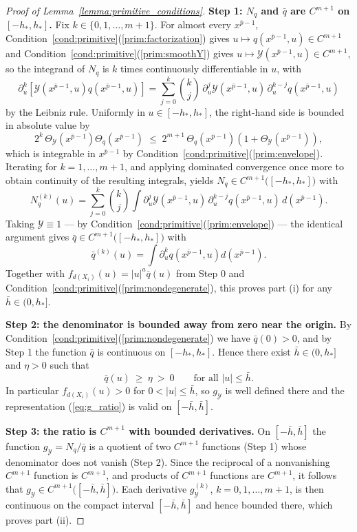 \documentclass{article}
\begin{document}
\begin{appendices}
\begin{proof}[Proof of Lemma~\ref{lemma:primitive_conditions}]
\textbf{Step 1: $N_q$ and $\bar q$ are $C^{m+1}$ on $[-h_{*},h_{*}]$.}
Fix $k\in\{0,1,\dots,m+1\}$. For almost every $x^{\bar p-1}$,
Condition~\ref{cond:primitive}(\ref{prim:factorization}) gives
$u\mapsto q\!\left(x^{\bar p-1},u\right)\in C^{m+1}$ and
Condition~\ref{cond:primitive}(\ref{prim:smoothY}) gives
$u\mapsto \mathcal{Y}\!\left(x^{\bar p-1},u\right)\in C^{m+1}$, so the integrand
of $N_q$ is $k$ times continuously differentiable in $u$, with
\[
\partial_u^{k}\!\left[\mathcal{Y}\!\left(x^{\bar p-1},u\right)
  q\!\left(x^{\bar p-1},u\right)\right]
=\sum_{j=0}^{k}\binom{k}{j}\,
\partial_u^{j}\mathcal{Y}\!\left(x^{\bar p-1},u\right)\,
\partial_u^{k-j}q\!\left(x^{\bar p-1},u\right)
\]
by the Leibniz rule. Uniformly in $u\in[-h_{*},h_{*}]$, the right-hand side is
bounded in absolute value by
\[
    2^{k}\,\Theta_{\mathcal{Y}}\!\left(x^{\bar p-1}\right)
    \Theta_{q}\!\left(x^{\bar p-1}\right)
    \;\le\;2^{m+1}\,\Theta_{q}\!\left(x^{\bar p-1}\right)
    \left(1+\Theta_{\mathcal{Y}}\!\left(x^{\bar p-1}\right)\right),
\]
which is integrable in $x^{\bar p-1}$ by
Condition~\ref{cond:primitive}(\ref{prim:envelope}). Iterating for $k=1,\dots,m+1$, and
applying dominated convergence once more to obtain continuity of the resulting
integrals, yields $N_q\in C^{m+1}\bigl([-h_{*},h_{*}]\bigr)$ with
\[
N_q^{(k)}(u)
=\sum_{j=0}^{k}\binom{k}{j}\int
\partial_u^{j}\mathcal{Y}\!\left(x^{\bar p-1},u\right)\,
\partial_u^{k-j}q\!\left(x^{\bar p-1},u\right)\,d\!\left(x^{\bar p-1}\right).
\]
Taking $\mathcal{Y}\equiv 1$ — by
Condition~\ref{cond:primitive}(\ref{prim:envelope}) — the identical argument gives
$\bar q\in C^{m+1}\bigl([-h_{*},h_{*}]\bigr)$ with
\[
    \bar q^{(k)}(u)=\int \partial_u^{k}q\!\left(x^{\bar p-1},u\right)
    d\!\left(x^{\bar p-1}\right).
\]
Together with $f_{d(X_i)}(u)=|u|^{a}\bar q(u)$ from Step 0 and
Condition~\ref{cond:primitive}(\ref{prim:nondegenerate}), this proves part (i)
for any $\bar h\in(0,h_{*}]$.
 
\textbf{Step 2: the denominator is bounded away from zero near the origin.}
By Condition~\ref{cond:primitive}(\ref{prim:nondegenerate}) we have
$\bar q(0)>0$, and by Step 1 the function $\bar q$ is continuous on
$[-h_{*},h_{*}]$. Hence there exist $\bar h\in(0,h_{*}]$ and $\eta>0$ such that
\[
    \bar q(u)\ \ge\ \eta\ >\ 0\qquad\text{for all }|u|\le \bar h .
\]
In particular $f_{d(X_i)}(u)>0$ for $0<|u|\le \bar h$, so $g_{\mathcal{Y}}$ is
well defined there and the representation (\ref{eq:g_ratio}) is valid on
$[-\bar h,\bar h]$.
 
\textbf{Step 3: the ratio is $C^{m+1}$ with bounded derivatives.}
On $[-\bar h,\bar h]$ the function $g_{\mathcal{Y}}=N_q/\bar q$ is a quotient of
two $C^{m+1}$ functions (Step 1) whose denominator does not vanish (Step 2).
Since the reciprocal of a nonvanishing $C^{m+1}$ function is $C^{m+1}$, and
products of $C^{m+1}$ functions are $C^{m+1}$, it follows that
$g_{\mathcal{Y}}\in C^{m+1}\bigl([-\bar h,\bar h]\bigr)$. Each derivative
$g_{\mathcal{Y}}^{(k)}$, $k=0,1,\dots,m+1$, is then continuous on the compact
interval $[-\bar h,\bar h]$ and hence bounded there, which proves part (ii).
\end{proof}



\end{appendices}
\end{document}
